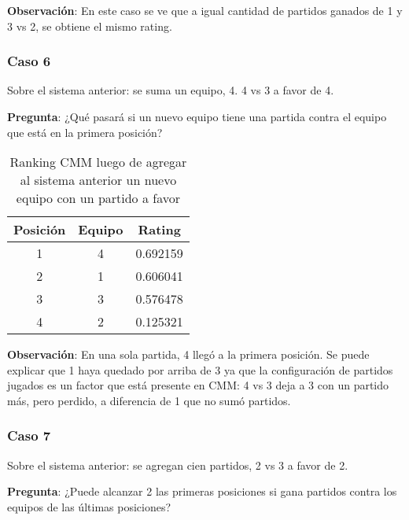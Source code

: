 \textbf{Observación}: En este caso se ve que a igual cantidad de partidos ganados de 1 y 3 vs 2, se obtiene el mismo rating.

\subsubsection*{Caso 6}

Sobre el sistema anterior: se suma un equipo, 4. 4 vs 3 a favor de 4.

\textbf{Pregunta}: ¿Qué pasará si un nuevo equipo tiene una partida contra el equipo que está en la primera posición?

\begin{table}[h!]
    \begin{center}
        \begin{tabular}{|c|c|c|}
        \hline
        \textbf{Posición} & \textbf{Equipo} & \textbf{Rating} \\
        \hline
        1 & 4 & 0.692159\\
        2 & 1 & 0.606041\\
        3 & 3 & 0.576478\\
        4 & 2 & 0.125321\\
        \hline
        \end{tabular}
        \caption{Ranking CMM luego de agregar al sistema anterior un nuevo equipo con un partido a favor}
        \label{cmm_caso_6}
    \end{center}
\end{table}

\textbf{Observación}: En una sola partida, 4 llegó a la primera posición. Se puede explicar que 1 haya quedado por arriba de 3 ya que la configuración de partidos jugados es un factor que está presente en CMM: 4 vs 3 deja a 3 con un partido más, pero perdido, a diferencia de 1 que no sumó partidos.

\newpage

\subsubsection*{Caso 7}

Sobre el sistema anterior: se agregan cien partidos, 2 vs 3 a favor de 2.

\textbf{Pregunta}: ¿Puede alcanzar 2 las primeras posiciones si gana partidos contra los equipos de las últimas posiciones?

